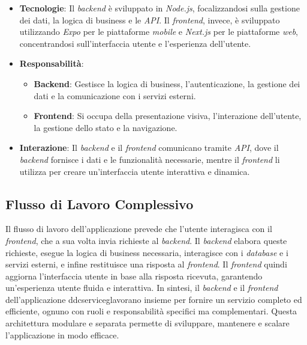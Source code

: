 \begin{itemize}
    \item \textbf{Tecnologie}: Il \textit{backend} è sviluppato in \textit{Node.js}, focalizzandosi sulla gestione dei dati, la logica di business e le \textit{API}. 
    Il \textit{frontend}, invece, è sviluppato utilizzando \textit{Expo} per le piattaforme \textit{mobile} e \textit{Next.js} per le piattaforme \textit{web}, concentrandosi sull'interfaccia utente e l'esperienza dell'utente.
    
    \item \textbf{Responsabilità}: 
    \begin{itemize}
        \item \textbf{Backend}: Gestisce la logica di business, l'autenticazione, la gestione dei dati e la comunicazione con i servizi esterni.
        \item \textbf{Frontend}: Si occupa della presentazione visiva, l'interazione dell'utente, la gestione dello stato e la navigazione.
    \end{itemize}

    \item \textbf{Interazione}: Il \textit{backend} e il \textit{frontend} comunicano tramite \textit{API}, dove il \textit{backend} fornisce i dati e le funzionalità necessarie, mentre il \textit{frontend} li utilizza per creare un'interfaccia utente interattiva e dinamica.
\end{itemize}

\subsection{Flusso di Lavoro Complessivo}
Il flusso di lavoro dell'applicazione prevede che l'utente interagisca con il \textit{frontend}, che a sua volta invia richieste al \textit{backend}. Il \textit{backend} elabora queste richieste, esegue la logica di business necessaria, interagisce con i \textit{database} e i servizi esterni, e infine restituisce una risposta al \textit{frontend}.
Il \textit{frontend} quindi aggiorna l'interfaccia utente in base alla risposta ricevuta, garantendo un'esperienza utente fluida e interattiva.
In sintesi, il \textit{backend} e il \textit{frontend} dell'applicazione \gls{ddcserviceg}\glox lavorano insieme per fornire un servizio completo ed efficiente, ognuno con ruoli e responsabilità specifici ma complementari.
Questa architettura modulare e separata permette di sviluppare, mantenere e scalare l'applicazione in modo efficace.



